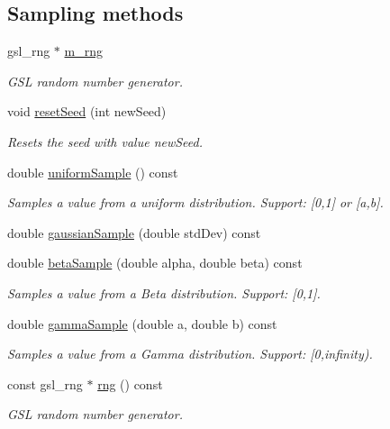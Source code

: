 \subsection*{Sampling methods}
\begin{DoxyCompactItemize}
\item 
gsl\-\_\-rng $\ast$ \hyperlink{class_q_u_e_s_o_1_1_rng_gsl_a48893d570695ebf59f8b96e28b9739b1}{m\-\_\-rng}
\begin{DoxyCompactList}\small\item\em G\-S\-L random number generator. \end{DoxyCompactList}\item 
void \hyperlink{class_q_u_e_s_o_1_1_rng_gsl_a95e515676ae7b503bd3b72eea7432598}{reset\-Seed} (int new\-Seed)
\begin{DoxyCompactList}\small\item\em Resets the seed with value {\ttfamily new\-Seed}. \end{DoxyCompactList}\item 
double \hyperlink{class_q_u_e_s_o_1_1_rng_gsl_a903f2db902f287a0d7d85f68d95d7225}{uniform\-Sample} () const 
\begin{DoxyCompactList}\small\item\em Samples a value from a uniform distribution. Support\-: \mbox{[}0,1\mbox{]} or \mbox{[}a,b\mbox{]}. \end{DoxyCompactList}\item 
double \hyperlink{class_q_u_e_s_o_1_1_rng_gsl_a4ebf1a75b394d2a650c1742c132b00c4}{gaussian\-Sample} (double std\-Dev) const 
\item 
double \hyperlink{class_q_u_e_s_o_1_1_rng_gsl_a4cfa51656336eadbd137c7698e5f1b59}{beta\-Sample} (double alpha, double beta) const 
\begin{DoxyCompactList}\small\item\em Samples a value from a Beta distribution. Support\-: \mbox{[}0,1\mbox{]}. \end{DoxyCompactList}\item 
double \hyperlink{class_q_u_e_s_o_1_1_rng_gsl_a18017f2291ad584f169a7efc7ca5dd32}{gamma\-Sample} (double a, double b) const 
\begin{DoxyCompactList}\small\item\em Samples a value from a Gamma distribution. Support\-: \mbox{[}0,infinity). \end{DoxyCompactList}\item 
const gsl\-\_\-rng $\ast$ \hyperlink{class_q_u_e_s_o_1_1_rng_gsl_a39503b939878d0e709f98aceba97dd1b}{rng} () const 
\begin{DoxyCompactList}\small\item\em G\-S\-L random number generator. \end{DoxyCompactList}\end{DoxyCompactItemize}

